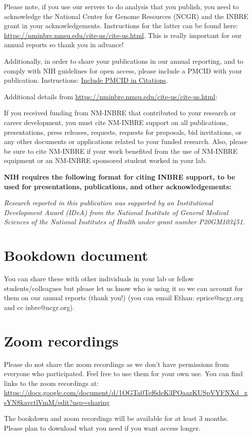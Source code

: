 \documentclass[
]{book}
\begin{document}
Please note, if you use our servers to do analysis that you publish, you need to acknowledge the National Center for Genome Resources (NCGR) and the INBRE grant in your acknowledgements. Instructions for the latter can be found here: \url{https://nminbre.nmsu.edu/cite-us/cite-us.html}. This is really important for our annual reports so thank you in advance!

Additionally, in order to share your publications in our annual reporting, and to comply with NIH guidelines for open access, please include a PMCID with your publication. Instructions: \href{https://publicaccess.nih.gov/include-pmcid-citations.htm}{Include PMCID in Citations}.

Additional details from \url{https://nminbre.nmsu.edu/cite-us/cite-us.html}:

{If you received funding from NM-INBRE that contributed to your research or career development, you must cite NM-INBRE support on all publications, presentations, press releases, requests, requests for proposals, bid invitations, or any other documents or applications related to your funded research. Also, please be sure to cite NM-INBRE if your work benefited from the use of NM-INBRE equipment or an NM-INBRE sponsored student worked in your lab.}

{\textbf{NIH requires the following format for citing INBRE support, to be used for presentations, publications, and other acknowledgements:}}

{\emph{Research reported in this publication was supported by an Institutional Development Award (IDeA) from the National Institute of General Medical Sciences of the National Institutes of Health under grant number P20GM103451.}}

\hypertarget{bookdown-document}{%
\section{Bookdown document}\label{bookdown-document}}

You can share these with other individuals in your lab or fellow students/colleagues but please let us know who is using it so we can account for them on our annual reports (thank you!) (you can email Ethan: eprice@ncgr.org and cc inbre@ncgr.org).

\hypertarget{zoom-recordings}{%
\section{Zoom recordings}\label{zoom-recordings}}

Please do not share the zoom recordings as we don't have permissions from everyone who participated. Feel free to use them for your own use.
You can find links to the zoom recordings at: \url{https://docs.google.com/document/d/1OGTa0Tef6deK3POaazKUSpVYFNXd_xsYN8kavctlVmM/edit?usp=sharing}

The bookdown and zoom recordings will be available for at least 3 months. Please plan to download what you need if you want access longer.

  
\end{document}
